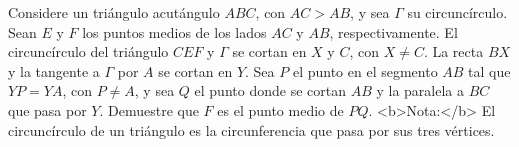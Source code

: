 Considere un triángulo acutángulo $ABC$, con $AC > AB$, y sea $\Gamma$ su circuncírculo. Sean $E$ y $F$ los puntos medios de los lados $AC$ y $AB$, respectivamente. El circuncírculo del triángulo $CEF$ y $\Gamma$ se cortan en $X$ y $C$, con $X \neq C$. La recta $BX$ y la tangente a $\Gamma$ por $A$ se cortan en $Y$. Sea $P$ el punto en el segmento $AB$ tal que$YP = YA$, con $P \neq A$, y sea $Q$ el punto donde se cortan $AB$ y la paralela a $BC$ que pasa por $Y$. Demuestre que $F$ es el punto medio de $PQ$. \newline 
<b>Nota:</b> El circuncírculo de un triángulo es la circunferencia que pasa por sus tres vértices.
